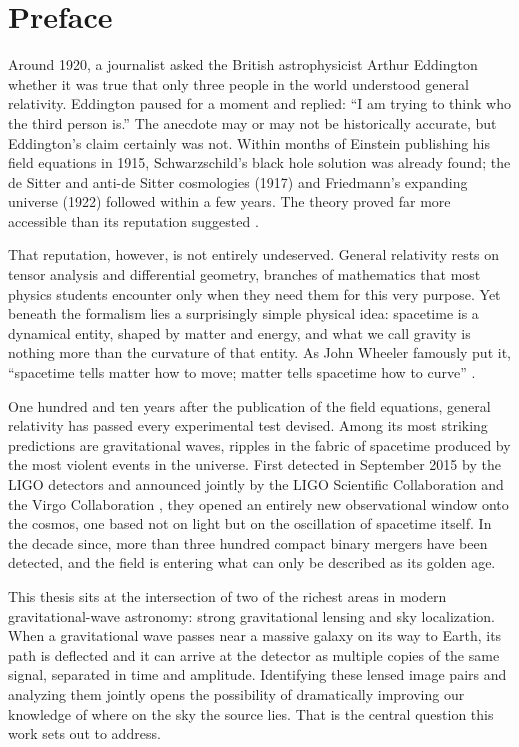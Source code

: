 \chapter*{\textbf{Preface}}
{}

Around 1920, a journalist asked the British astrophysicist Arthur Eddington whether it was true that only three people in the world understood general relativity. Eddington paused for a moment and replied: ``I am trying to think who the third person is.'' The anecdote may or may not be historically accurate, but Eddington's claim 
certainly was not. Within months of Einstein publishing his field equations in 1915, Schwarzschild's black hole solution was already found; the de Sitter and anti-de Sitter cosmologies (1917) and Friedmann's expanding universe (1922) followed within a few years. The theory proved far more accessible than its reputation suggested \cite{LlibreBertJanssen}.

That reputation, however, is not entirely undeserved. General 
relativity rests on tensor analysis and differential geometry, branches of mathematics that most physics students encounter only when they need them for this very purpose. Yet beneath the formalism lies a surprisingly simple physical idea: spacetime is a dynamical entity, shaped by matter and energy, and what we call gravity is nothing more than the curvature of that entity. As John Wheeler famously put it, ``spacetime tells matter how to move; matter tells spacetime how to curve'' \cite{WheelerFord1998}.

One hundred and ten years after the publication of the field 
equations, general relativity has passed every experimental test devised. Among its most striking predictions are gravitational waves, ripples in the fabric of spacetime produced by the most violent events in the universe. First detected in September 2015 by the LIGO detectors and announced jointly by the LIGO Scientific Collaboration and the Virgo Collaboration \cite{GW150914}, they opened
an entirely new observational window onto the cosmos, one based not on light but on the oscillation of spacetime itself. In the decade since, more than three hundred compact binary mergers have been detected, and the field is entering what can only be described as its golden age.

This thesis sits at the intersection of two of the richest areas in modern gravitational-wave astronomy: strong gravitational lensing and sky localization. When a gravitational wave passes near a massive galaxy on its way to Earth, its path is deflected and it can arrive at the detector as multiple copies of the same signal, separated in time and amplitude. Identifying these lensed image pairs and analyzing them jointly opens the possibility of dramatically improving our knowledge of where on the sky the source lies. That is the central question this work sets out to address.